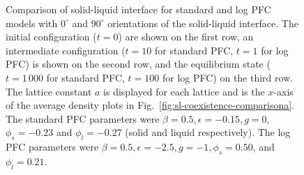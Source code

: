 \begin{figure}[!htbp]
  \caption{Comparison of solid-liquid interface for standard and log PFC models with $0^\circ$ and $90^\circ$ orientations of the solid-liquid interface.  The initial configuration ($t=0$) are shown on the first row, an intermediate configuration ($t=10$ for standard PFC, $t=1$ for log PFC) is shown on the second row, and the equilibrium state ($t = 1\,000$ for standard PFC, $t = 100$ for log PFC) on the third row.  The lattice constant $a$ is displayed for each lattice and is the $x$-axis of the average density plots in Fig.~\ref{fig:sl-coexistence-comparisona}.  The standard PFC parameters were $\beta = 0.5, \epsilon = -0.15, g = 0$, $\phi_s = -0.23$ and $\phi_l = -0.27$ (solid and liquid respectively).  The log PFC parameters were $\beta = 0.5, \epsilon = -2.5, g = -1, \phi_s = 0.50$, and $\phi_l = 0.21$.}
  \label{fig:sl-coexistence-comparison}
\end{figure}

